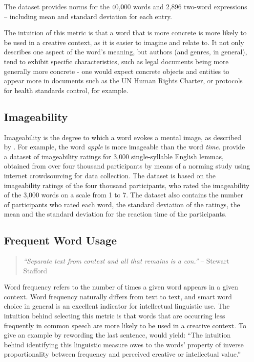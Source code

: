The dataset provides norms for the 40,000 words and 2,896 two-word expressions -- including mean and standard deviation for each entry.

The intuition of this metric is that a word that is more concrete is more likely to be used in a creative context, as it is easier to imagine and relate to. It not only describes one aspect of the word's meaning, but authors (and genres, in general), tend to exhibit specific characteristics, such as legal documents being more generally more concrete - one would expect concrete objects and entities to appear more in documents such as the UN Human Rights Charter, or protocols for health standards control, for example. 

\subsection{Imageability}
\label{sec:imageability}
Imageability is the degree to which a word evokes a mental image, as described by \cite{degroot1989representational}. For example, the word \textit{apple} is more imageable than the word \textit{time}. \cite{cortese_imageability_2004} provide a dataset of imageability ratings for 3,000 single-syllable English lemmas, obtained from over four thousand participants by means of a norming study using internet crowdsourcing for data collection. The dataset is based on the imageability ratings of the four thousand participants, who rated the imageability of the 3,000 words on a scale from 1 to 7. The dataset also contains the number of participants who rated each word, the standard deviation of the ratings, the mean and the standard deviation for the reaction time of the participants.

\subsection{Frequent Word Usage}
\label{frequency}

\begin{quote}
\textit{    “Separate text from context and all that remains is a con.”} -- Stewart Stafford 
\end{quote}

Word frequency refers to the number of times a given word appears in a given context. Word frequency naturally differs from text to text, and smart word choice in general is an excellent indicator for intellectual linguistic use. The intuition behind selecting this metric is that words that are occurring less frequently in common speech are more likely to be used in a creative context. To give an example by rewording the last sentence, would yield: ``The intuition behind identifying this linguistic measure owes to the words' property of inverse proportionality between frequency and perceived creative or intellectual value.''

